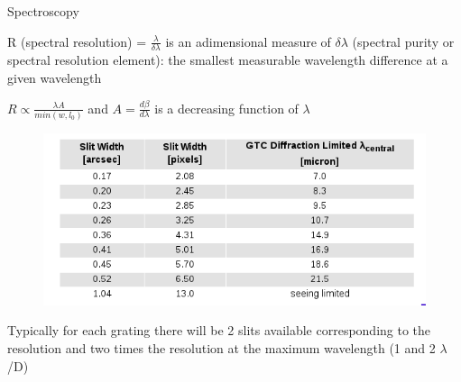 \documentclass{beamer}
\begin{document}
\begin{frame}{Spectroscopy}

R (spectral resolution) = $\frac{\lambda}{\delta \lambda}$  
is an adimensional measure of  $\delta \lambda$ (spectral purity or spectral resolution element):
the smallest measurable wavelength difference at a given wavelength

$R \propto \frac{\lambda A}{min(w,l_0)}$ and $A=\frac{d\beta}{d \lambda}$ is a decreasing function of $\lambda$

\begin{figure}[H]
 \centering
 \includegraphics[scale=0.32]{img9.png}
\end{figure}
Typically for each grating there will be 2 slits available corresponding to the resolution and two times the resolution at the 
maximum wavelength (1 and 2 $\lambda$/D)
\end{frame}
\end{document}
